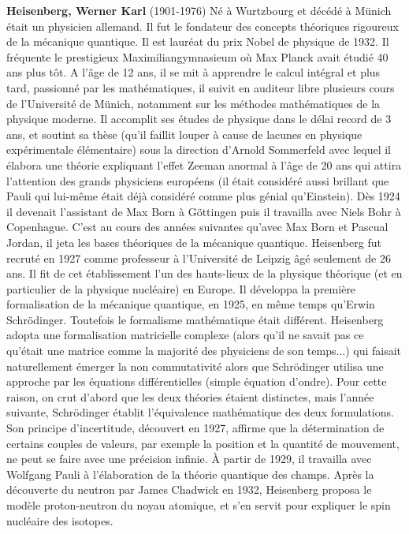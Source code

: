 \textbf{Heisenberg, Werner Karl} (1901-1976) Né à Wurtzbourg et décédé à Münich était un physicien allemand. Il fut le fondateur des concepts théoriques rigoureux de la mécanique quantique. Il est lauréat du prix Nobel de physique de 1932. Il fréquente le prestigieux Maximiliangymnasieum où Max Planck avait étudié 40 ans plus tôt. A l'âge de 12 ans, il se mit à apprendre le calcul intégral et plus tard, passionné par les mathématiques, il suivit en auditeur libre plusieurs cours de l'Université de Münich, notamment sur les méthodes mathématiques de la physique moderne. Il accomplit ses études de physique dans le délai record de 3 ans, et soutint sa thèse (qu'il faillit louper à cause de lacunes en physique expérimentale élémentaire) sous la direction d'Arnold Sommerfeld avec lequel il élabora une théorie expliquant l'effet Zeeman anormal à l'âge de 20 ans qui attira l'attention des grands physiciens européens (il était considéré aussi brillant que Pauli qui lui-même était déjà considéré comme plus génial qu'Einstein). Dès 1924 il devenait l'assistant de Max Born à Göttingen puis il travailla avec Niels Bohr à Copenhague. C'est au cours des années suivantes qu'avec Max Born et Pascual Jordan, il jeta les bases théoriques de la mécanique quantique. Heisenberg fut recruté en 1927 comme professeur à l'Université de Leipzig âgé seulement de 26 ans. Il fit de cet établissement l'un des hauts-lieux de la physique théorique (et en particulier de la physique nucléaire) en Europe. Il développa la première formalisation de la mécanique quantique, en 1925, en même temps qu'Erwin Schrödinger. Toutefois le formalisme mathématique était différent. Heisenberg adopta une formalisation matricielle complexe (alors qu'il ne savait pas ce qu'était une matrice comme la majorité des physiciens de son temps...) qui faisait naturellement émerger la non commutativité alors que Schrödinger utilisa une approche par les équations différentielles (simple équation d'ondre). Pour cette raison, on crut d'abord que les deux théories étaient distinctes, mais l'année suivante, Schrödinger établit l'équivalence mathématique des deux formulations. Son principe d'incertitude, découvert en 1927, affirme que la détermination de certains couples de valeurs, par exemple la position et la quantité de mouvement, ne peut se faire avec une précision infinie. À partir de 1929, il travailla avec Wolfgang Pauli à l'élaboration de la théorie quantique des champs. Après la découverte du neutron par James Chadwick en 1932, Heisenberg proposa le modèle proton-neutron du noyau atomique, et s'en servit pour expliquer le spin nucléaire des isotopes.

